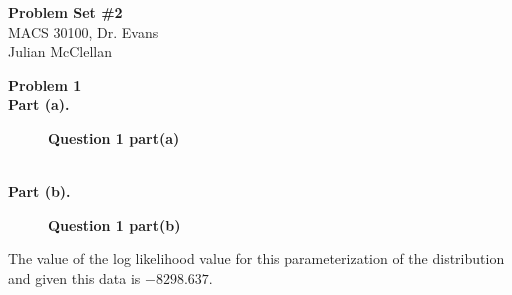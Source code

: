 \documentclass[letterpaper,12pt]{article}
\theoremstyle{definition}
\begin{document}
\begin{flushleft}
  \textbf{\large{Problem Set \#2}} \\
  MACS 30100, Dr. Evans \\
  Julian McClellan
\end{flushleft}

\vspace{5mm}

\noindent\textbf{Problem 1} 
\\
\noindent\textbf{Part (a).} 
\begin{figure}[htb]\centering\captionsetup{width=4.0in}
  \caption{\textbf{Question 1 part(a)}}\label{Figure 1a}
\end{figure}

\\
\noindent\textbf{Part (b).} 
\begin{figure}[htb]\centering\captionsetup{width=4.0in}
  \caption{\textbf{Question 1 part(b)}}\label{Figure 1b}
\end{figure}
The value of the log likelihood value for this parameterization of the distribution
and given this data is $-8298.637$.
\end{document}
